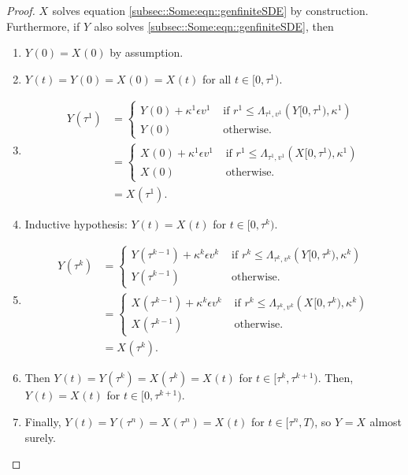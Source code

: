 \documentclass[12pt]{article}
\newcommand{\te}{\text}
\newcommand{\ep}{\epsilon}
\renewcommand{\v}{v}							%
\newcommand{\ev}{\ep}							%
\newcommand{\T}{T}								%
\renewcommand{\t}{t}							%
\renewcommand{\r}{r}								%
\newcommand{\rt}[1]{\tau^{#1}}						%
\renewcommand{\it}{k}								%
\newcommand{\numb}{n}								%
\newcommand{\rxvt}[2]{X_{#1}{(#2)}}					%
\newcommand{\rxvtt}[2]{Y_{#1}{(#2)}}				%
\newcommand{\rxvts}[2]{X_{#1}{#2}}					%
\newcommand{\rxvtts}[2]{Y_{#1}{#2}}					%
\newcommand{\ratee}[1]{\Lambda_{#1}}				%
\renewcommand{\mark}[1]{\kappa^{#1}}				%
\begin{document}
\begin{proof}
\(\rxvts{}{}\) solves equation \eqref{subsec::Some:eqn::genfiniteSDE} by construction. Furthermore, if \(\rxvtts{}{}\) also solves \eqref{subsec::Some:eqn::genfiniteSDE}, then 

\begin{enumerate}
\item \(\rxvtt{}{0} = \rxvt{}{0}\) by assumption.

\item \(\rxvtt{}{\t} = \rxvtt{}{0} = \rxvt{}{0} = \rxvt{}{\t}\) for all \(\t\in [0,\rt{1})\).

\item 

\begin{align*}
\rxvtt{}{\rt{1}} &= \begin{cases}
\rxvtt{}{0} + \mark{1}\ev{\v^1} &\te{ if } \r^1 \leq \ratee{\rt{1},\v^1}(\rxvtts{}{[0,\rt{1})},\mark{1})\\
\rxvtt{}{0} &\te{ otherwise.}
\end{cases}\\
&= \begin{cases}
\rxvt{}{0} + \mark{1}\ev{\v^1} &\te{ if } \r^1 \leq \ratee{\rt{1},\v^1}(\rxvts{}{[0,\rt{1})},\mark{1})\\
\rxvt{}{0} &\te{ otherwise.}
\end{cases}\\
&= \rxvt{}{\rt{1}}.
\end{align*}

\item Inductive hypothesis: \(\rxvtt{}{\t} = \rxvt{}{\t}\) for \(\t\in [0,\rt{\it})\). 

\item 

\begin{align*}
\rxvtt{}{\rt{\it}} &= \begin{cases}
\rxvtt{}{\rt{\it-1}} + \mark{\it}\ev{\v^\it} &\te{ if } \r^\it \leq \ratee{\rt{\it},\v^\it}(\rxvtts{}{[0,\rt{\it})},\mark{\it})\\
\rxvtt{}{\rt{\it-1}} &\te{ otherwise.}
\end{cases}\\
&= \begin{cases}
\rxvt{}{\rt{\it-1}} + \mark{\it}\ev{\v^\it} &\te{ if } \r^\it \leq \ratee{\rt{\it},\v^\it}(\rxvts{}{[0,\rt{\it})},\mark{\it})\\
\rxvt{}{\rt{\it-1}} &\te{ otherwise.}
\end{cases}\\
&= \rxvt{}{\rt{\it}}.
\end{align*}

\item Then \(\rxvtt{}{\t} = \rxvtt{}{\rt{\it}} = \rxvt{}{\rt{\it}} = \rxvt{}{\t}\) for \(\t \in [\rt{\it},\rt{\it+1})\). Then, \(\rxvtt{}{\t} = \rxvt{}{\t}\) for \(\t\in [0,\rt{\it+1})\).

\item Finally, \(\rxvtt{}{\t} = \rxvtt{}{\rt{\numb}} = \rxvt{}{\rt{\numb}} = \rxvt{}{\t}\) for \(\t\in [\rt{\numb},\T)\), so \(\rxvtts{}{} = \rxvts{}{}\) almost surely.
\end{enumerate}
\end{proof}
\end{document}
